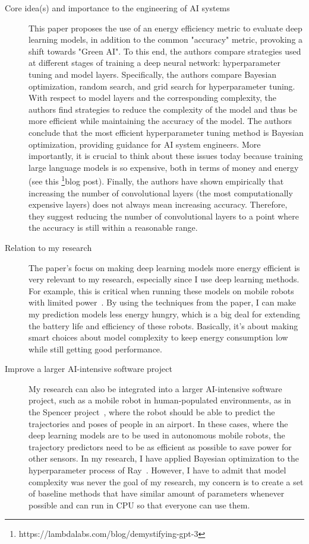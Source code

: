 \documentclass{article}
\begin{document}
\begin{description}
    \item[Core idea(s) and importance to the engineering of AI systems] This paper proposes the use of an energy efficiency metric to evaluate deep learning models, in addition to the common "accuracy" metric, provoking a shift towards "Green AI". To this end, the authors compare strategies used at different stages of training a deep neural network: hyperparameter tuning and model layers. Specifically, the authors compare Bayesian optimization, random search, and grid search for hyperparameter tuning. With respect to model layers and the corresponding complexity, the authors find strategies to reduce the complexity of the model and thus be more efficient while maintaining the accuracy of the model. The authors conclude that the most efficient hyperparameter tuning method is Bayesian optimization, providing guidance for AI system engineers. More importantly, it is crucial to think about these issues today because training large language models is so expensive, both in terms of money and energy (see this \footnote{https://lambdalabs.com/blog/demystifying-gpt-3}{blog post}). Finally, the authors have shown empirically that increasing the number of convolutional layers (the most computationally expensive layers) does not always mean increasing accuracy. Therefore, they suggest reducing the number of convolutional layers to a point where the accuracy is still within a reasonable range.
    
    \item[Relation to my research] The paper's focus on making deep learning models more energy efficient is very relevant to my research, especially since I use deep learning methods. For example, this is critical when running these models on mobile robots with limited power~\cite{mei06}. By using the techniques from the paper, I can make my prediction models less energy hungry, which is a big deal for extending the battery life and efficiency of these robots. Basically, it's about making smart choices about model complexity to keep energy consumption low while still getting good performance.

    \item[Improve a larger AI-intensive software project] My research can also be integrated into a larger AI-intensive software project, such as a mobile robot in human-populated environments, as in the Spencer project~\cite{rafi16}, where the robot should be able to predict the trajectories and poses of people in an airport. In these cases, where the deep learning models are to be used in autonomous mobile robots, the trajectory predictors need to be as efficient as possible to save power for other sensors. In my research, I have applied Bayesian optimization to the hyperparameter process of Ray~\cite{liaw2018tune}. However, I have to admit that model complexity was never the goal of my research, my concern is to create a set of baseline methods that have similar amount of parameters whenever possible and can run in CPU so that everyone can use them.


\end{description}
\end{document}

